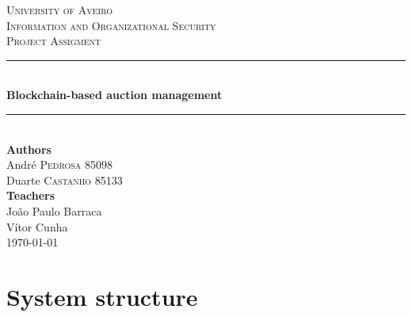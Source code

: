 \documentclass[12pt]{article}
\begin{document}
\begin{titlepage}
\newcommand{\HRule}{\rule{\linewidth}{0.1mm}} 
\center %
 
\textsc{\Large University of Aveiro }\\[0.5cm]
\textsc{\Large Information and Organizational Security }\\[0.5cm]
\textsc{\large Project Assigment }\\[0.5cm]

\HRule \\[0.4cm]
{ \huge \bfseries Blockchain-based auction management}\\[0.1cm]
\HRule \\[1.5cm]
 



\LARGE \textbf{Authors}\\
\large André \textsc{Pedrosa} 85098 \\
\large Duarte \textsc{Castanho} 85133\\
\vspace{5mm}
\LARGE \textbf{Teachers}\\ 
\large João Paulo Barraca\\
\large Vítor Cunha\\
\vspace{30mm}
{\large \today}\\[1cm]
\vfill

\end{titlepage}

\tableofcontents


\newpage

\section{System structure}
\end{document}
